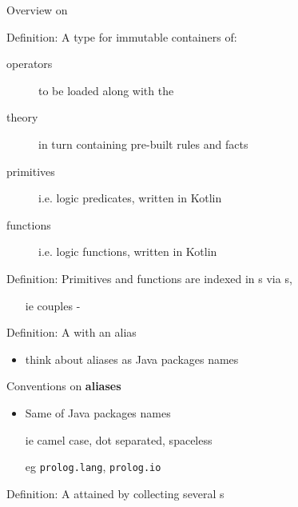 \documentclass[handout]{beamer}
\begin{document}
\begin{frame}[allowframebreaks]{Overview on }
    \framebreak

    \begin{block}{Definition: }
        A type for \alert{immutable} containers of:
        \begin{description}
            \item[operators] to be loaded along with the 
            \item[theory] in turn containing pre-built rules and facts
            \item[primitives] i.e. logic predicates, written in Kotlin
            \item[functions] i.e. logic functions, written in Kotlin 
        \end{description}
    \end{block}

    \begin{block}{Definition: }
        Primitives and functions are indexed in s via s,
        \begin{itemize}
            \item[ie] couples -
        \end{itemize}
    \end{block}

    \framebreak

    \begin{block}{Definition: }
        A  with an \alert{alias}
        \begin{itemize}
            \item think about aliases as Java packages names
        \end{itemize}
    \end{block}

    \begin{exampleblock}{Conventions on \textbf{aliases}}
        \begin{itemize}
            \item Same of Java packages names
            \item[ie] camel case, dot separated, spaceless
            \item[eg] \texttt{prolog.lang}, \texttt{prolog.io} 
        \end{itemize}
    \end{exampleblock}

    \framebreak

    \begin{block}{Definition: }
        A  attained by collecting several s
    \end{block}


\end{frame}
\end{document}
